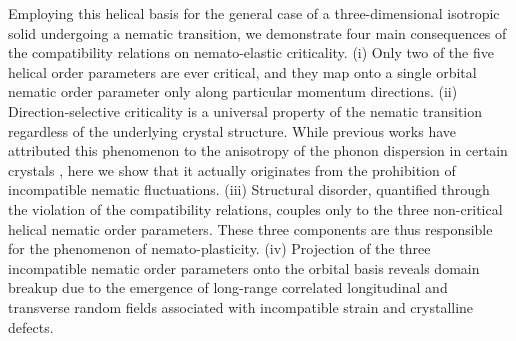 \documentclass[aps,prb, twocolumn, superscriptaddress, amsmath, amsfonts, amssymb, amsthm]{revtex4-2}
\begin{document}
Employing this helical basis for the general case of a three-dimensional isotropic solid undergoing a nematic transition, we demonstrate four main consequences of the compatibility relations on nemato-elastic criticality. (i) Only two of the five helical order parameters are ever critical, and they map onto a single orbital nematic order parameter only along particular momentum directions. (ii) Direction-selective criticality is a universal property of the nematic transition regardless of the underlying crystal structure. While previous works have attributed this phenomenon to the anisotropy of the phonon dispersion in certain crystals \cite{Karahasanovic16,Paul17,Fernandes2020}, here we show that it actually originates from the prohibition of incompatible nematic fluctuations. (iii) Structural disorder, quantified through the violation of the compatibility relations, couples only to the three non-critical helical nematic order parameters. These three components are thus responsible for the phenomenon of nemato-plasticity. (iv) Projection of the three incompatible nematic order parameters onto the orbital basis reveals domain breakup due to the emergence of long-range correlated longitudinal and transverse random fields associated with incompatible strain and crystalline defects.
\end{document}
